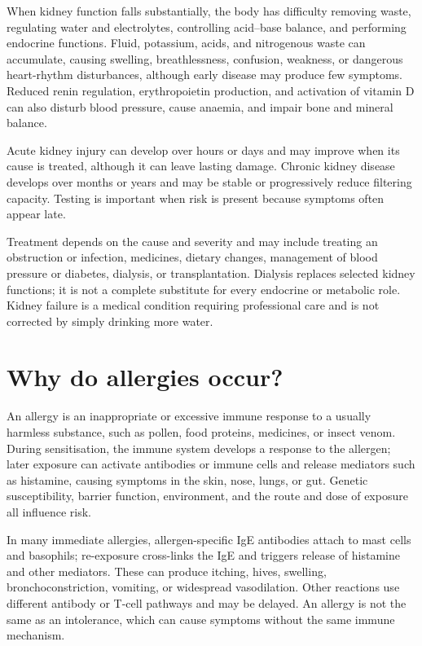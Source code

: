 \documentclass[11pt,oneside]{report}
\begin{document}
When kidney function falls substantially, the body has difficulty removing
waste, regulating water and electrolytes, controlling acid--base balance, and
performing endocrine functions. Fluid, potassium, acids, and nitrogenous waste
can accumulate, causing swelling, breathlessness, confusion, weakness, or
dangerous heart-rhythm disturbances, although early disease may produce few
symptoms. Reduced renin regulation, erythropoietin production, and activation
of vitamin D can also disturb blood pressure, cause anaemia, and impair bone
and mineral balance.

Acute kidney injury can develop over hours or days and may improve when its
cause is treated, although it can leave lasting damage. Chronic kidney disease
develops over months or years and may be stable or progressively reduce
filtering capacity. Testing is important when risk is present because symptoms
often appear late.

Treatment depends on the cause and severity and may include treating an
obstruction or infection, medicines, dietary changes, management of blood
pressure or diabetes, dialysis, or transplantation. Dialysis replaces selected
kidney functions; it is not a complete substitute for every endocrine or
metabolic role. Kidney failure is a medical condition requiring professional
care and is not corrected by simply drinking more water.

\section{Why do allergies occur?}

An allergy is an inappropriate or excessive immune response to a usually
harmless substance, such as pollen, food proteins, medicines, or insect venom.
During sensitisation, the immune system develops a response to the allergen;
later exposure can activate antibodies or immune cells and release mediators
such as histamine, causing symptoms in the skin, nose, lungs, or gut. Genetic
susceptibility, barrier function, environment, and the route and dose of
exposure all influence risk.

In many immediate allergies, allergen-specific IgE antibodies attach to mast
cells and basophils; re-exposure cross-links the IgE and triggers release of
histamine and other mediators. These can produce itching, hives, swelling,
bronchoconstriction, vomiting, or widespread vasodilation. Other reactions use
different antibody or T-cell pathways and may be delayed. An allergy is not the
same as an intolerance, which can cause symptoms without the same immune
mechanism.
\end{document}
